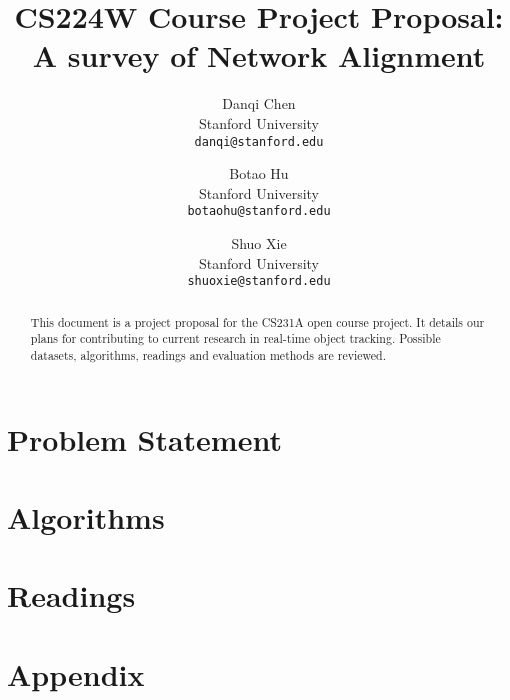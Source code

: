 \documentclass[11pt,letterpaper]{article}
\begin{document}
\title{CS224W Course Project Proposal: A survey of Network Alignment}

\author{Danqi Chen\\
Stanford University\\
{\tt\small danqi@stanford.edu}
\and
Botao Hu\\
Stanford University\\
{\tt\small botaohu@stanford.edu}
%
\and
Shuo Xie\\
Stanford University\\
{\tt\small shuoxie@stanford.edu}
}

\maketitle
\thispagestyle{empty}

\maketitle

\begin{abstract}
   This document is a project proposal for the CS231A open course project. It details our plans for contributing to current research in real-time object tracking. Possible datasets, algorithms, readings  and evaluation methods are reviewed.
\end{abstract}

\section{Problem Statement}

\section{Algorithms}



\section{Readings}

\cite{Ding2010,Wanga,Peng2012,Klau2009,Wondracek2010,Balduzzi2010,Koutra2011,Bayati2009,Bradde2010,Cromi2009,Flannick2009,Memisevic2012,Kreitmann2011,Narayanan2009,Delcher2002,Kollias2012,Mohammadi,Kuchaiev2007,Wangb,Liao2009,El-Kebir2011,Shi,Bayati2009a,Pache2012,Pache2012a,Kollias2011,Doan,Bayatia,Koyuturk2006,Todor2007,Narayanan2008,Burkhart2010,Backstrom2007}





\section{Appendix}
\end{document}
